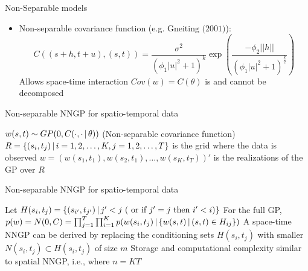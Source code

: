 \begin{frame}{Non-Separable models}
	\begin{itemize}
		\item Non-separable covariance function (e.g.$ \mbox{ Gneiting (2001)}$):
		\[C((s+h,t+u),(s,t)) = \frac{\sigma^2}{(\phi_1|u|^2+1)^k}\exp\left(\frac{-\phi_2||h||}{(\phi_1|u|^2+1)^{\frac k2}}\right)\] %
		\myitem Allows space-time interaction
		\myitem $Cov(w) = C(\theta)$ is  and cannot be decomposed
	\end{itemize}
\end{frame}

\begin{frame}{Non-separable NNGP for spatio-temporal data}
\begin{itemize}
\myitem $w(s,t) \sim GP(0,C(\cdot,\cdot \,|\, \theta))$ (Non-separable covariance function)
\myitem $R = \{(s_i,t_j) \,|\, i = 1,2,\ldots,K, j=1,2,\ldots,T\}$ is the grid where the data is observed
\myitem $w = (w(s_1,t_1),w(s_2,t_1),\ldots,w(s_K,t_T))'$ is the realizations of the GP over $R$
\end{itemize}
\end{frame}

\begin{frame}{Non-separable NNGP for spatio-temporal data}
\begin{itemize}
\myitem Let $H(s_i,t_j) = \{ (s_{i'}, t_{j'}) \,|\, j' < j \mbox { ( or if } j'=j \mbox{ then } i'<i)\}$
\myitem For the full GP, $p(w) = N(0,C) = \prod_{j=1}^T \prod_{i=1}^K p(w(s_i,t_j) \,|\, \{w(s,t) \,|\, (s,t) \in H_{ij}\})$
\myitem A space-time NNGP can be derived by replacing the conditioning sets $H(s_i,t_j)$ with smaller  $N(s_i,t_j) \subset H(s_i,t_j)$ of size $m$
\myitem Storage and computational complexity similar to spatial NNGP, i.e.,  where $n=KT$
\end{itemize}
\end{frame}

